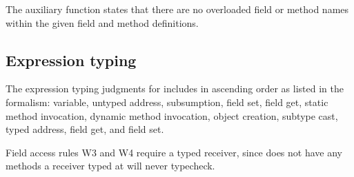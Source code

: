\documentclass[acmlarge, anonymous, authordraft]{acmart}
\begin{document}
The  auxiliary function states that there are no overloaded 
field or method names within the given field and method definitions. \\

\begin{mathpar}

\end{mathpar}

\begin{mathpar}
\end{mathpar}
 
\begin{mathpar}

\end{mathpar}

\begin{mathpar}
\end{mathpar}

\subsection{Expression typing}

The expression typing judgments for \kafka includes in ascending order as listed in the formalism:
variable, untyped address, subsumption, field set, field get, static method invocation, dynamic method invocation, object creation,
subtype cast,
typed address,  field get, and  field set.

Field access rules W3 and W4 require a typed receiver, since \any does not
have any methods a receiver typed at \any will never typecheck.
\end{document}
